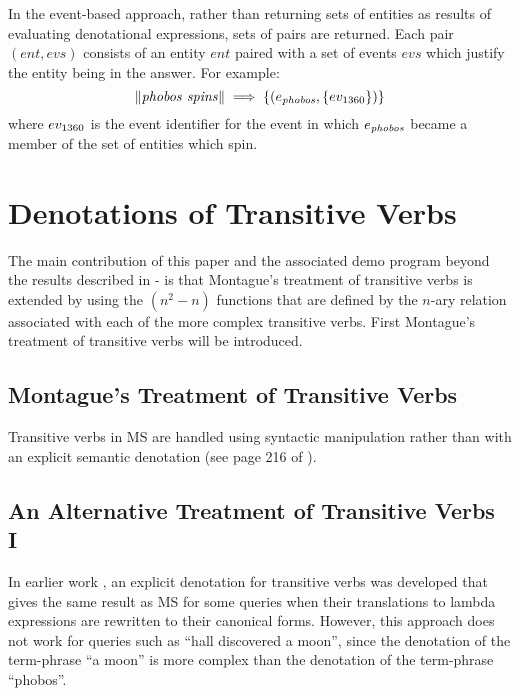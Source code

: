 \documentclass[../main.tex]{subfiles}
\begin{document}
\begin{refsection}
In the event-based approach, rather than returning sets of entities as results of evaluating denotational
expressions, sets of pairs are returned. Each pair $(\mathit{ent}, \mathit{evs})$ consists of an entity $\mathit{ent}$ paired with a set of
events $\mathit{evs}$ which justify the entity being in the answer. For example:
\[ \lVert \mathit{\mathit{phobos}\ \mathit{spins}} \rVert \implies \{(e_{\mathit{phobos}}, \{ev_{\mathrm{1360}}\})\} \]
where $ev_{\mathrm{1360}}$ is the event identifier for the event in which $e_{\mathit{phobos}}$ became a member of the set of entities which spin.


\section{Denotations of Transitive Verbs}
\label{icsc2020conf:newuevflms}

The main contribution of this paper and the associated demo program beyond the results described in \cite{frost2014demonstration}-\cite{hafiz:frost} is that Montague's treatment of transitive verbs is extended by using the
$(n^2 - n)$ functions that are defined by the $n$-ary relation associated with each of the more complex
transitive verbs. First Montague's treatment of transitive verbs will be introduced.

\subsection{Montague's Treatment of Transitive Verbs}


\label{icsc2020conf:montytransitive}
Transitive verbs in MS are handled using syntactic manipulation rather than with an explicit semantic denotation (see page 216 of \cite{Dowty:wall}).


\subsection{An Alternative Treatment of Transitive Verbs I}
In earlier work \cite {frost2006realization}, an explicit denotation for transitive verbs was developed that gives the same result as MS for some queries when their translations to lambda expressions are rewritten to their canonical forms. However, this approach does not work for queries such as ``hall discovered a moon'', since the denotation of the term-phrase ``a moon'' is more complex than the denotation of the term-phrase ``phobos''.


\end{refsection}
\end{document}
